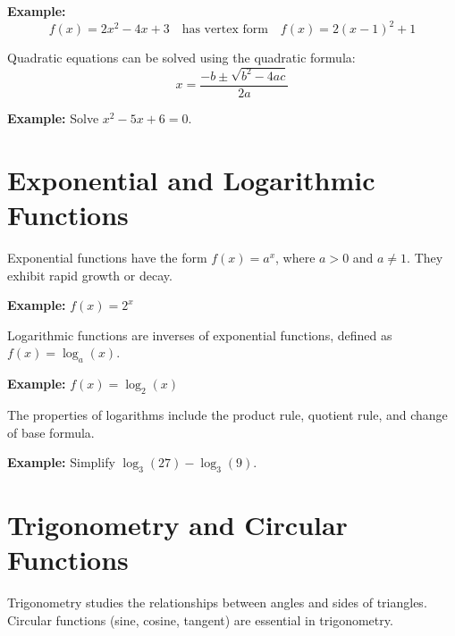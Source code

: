 \documentclass{article}
\begin{document}
\begin{framed}
\textbf{Example:}
\[ f(x) = 2x^2 - 4x + 3 \quad \text{has vertex form} \quad f(x) = 2(x - 1)^2 + 1 \]
\end{framed}

Quadratic equations can be solved using the quadratic formula:
\[ x = \frac{-b \pm \sqrt{b^2 - 4ac}}{2a} \]

\begin{framed}
\textbf{Example:}
Solve \(x^2 - 5x + 6 = 0\).
\end{framed}


\section{Exponential and Logarithmic Functions}
Exponential functions have the form \(f(x) = a^x\), where \(a > 0\) and \(a \neq 1\). They exhibit rapid growth or decay.

\begin{framed}
\textbf{Example:}
\(f(x) = 2^x\)
\end{framed}

Logarithmic functions are inverses of exponential functions, defined as \(f(x) = \log_a(x)\).

\begin{framed}
\textbf{Example:}
\(f(x) = \log_2(x)\)
\end{framed}

The properties of logarithms include the product rule, quotient rule, and change of base formula.

\begin{framed}
\textbf{Example:}
Simplify \(\log_3(27) - \log_3(9)\).
\end{framed}

\section{Trigonometry and Circular Functions}
Trigonometry studies the relationships between angles and sides of triangles. Circular functions (sine, cosine, tangent) are essential in trigonometry.
\end{document}
